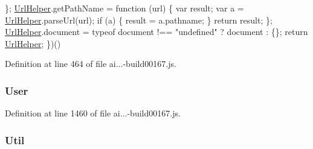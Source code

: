 \begin{DoxyCode}
            \};
            \hyperlink{obj_2_release_2_package_2_package_tmp_2_scripts_2ai_80_822_89-build00167_8js_a472b4d284dd284842438e13abaf8e3a3}{UrlHelper}.getPathName = \textcolor{keyword}{function} (url) \{
                var result;
                var a = \hyperlink{obj_2_release_2_package_2_package_tmp_2_scripts_2ai_80_822_89-build00167_8js_a472b4d284dd284842438e13abaf8e3a3}{UrlHelper}.parseUrl(url);
                \textcolor{keywordflow}{if} (a) \{
                    result = a.pathname;
                \}
                \textcolor{keywordflow}{return} result;
            \};
            \hyperlink{obj_2_release_2_package_2_package_tmp_2_scripts_2ai_80_822_89-build00167_8js_a472b4d284dd284842438e13abaf8e3a3}{UrlHelper}.document = typeof document !== \textcolor{stringliteral}{"undefined"} ? document : \{\};
            \textcolor{keywordflow}{return} \hyperlink{obj_2_release_2_package_2_package_tmp_2_scripts_2ai_80_822_89-build00167_8js_a472b4d284dd284842438e13abaf8e3a3}{UrlHelper};
        \})()
\end{DoxyCode}


Definition at line 464 of file ai...-\/build00167.\+js.

\subsubsection[{\texorpdfstring{User}{User}}]{ User}\hypertarget{_scripts_2ai_80_822_89-build00167_8js_a0bf83e41ae2819a20c5b1651d6e492ca}{}\label{_scripts_2ai_80_822_89-build00167_8js_a0bf83e41ae2819a20c5b1651d6e492ca}


Definition at line 1460 of file ai...-\/build00167.\+js.

\subsubsection[{\texorpdfstring{Util}{Util}}]{ Util}\hypertarget{_scripts_2ai_80_822_89-build00167_8js_adf40173670f3e2786a0ef699f8b1d965}{}\label{_scripts_2ai_80_822_89-build00167_8js_adf40173670f3e2786a0ef699f8b1d965}


